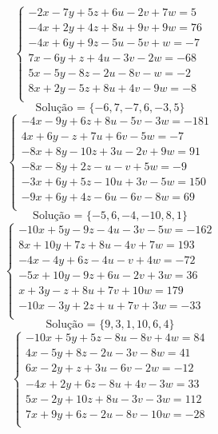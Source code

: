 \documentclass[12pt,oneside,a4paper]{article}
\begin{document}
\vspace{\baselineskip}
\begin{equation*}
\begin{cases}
-2x-7y+5z+6u-2v+7w=5 \\
-4x+2y+4z+8u+9v+9w=76 \\
-4x+6y+9z-5u-5v+w=-7 \\
7x-6y+z+4u-3v-2w=-68 \\
5x-5y-8z-2u-8v-w=-2 \\
8x+2y-5z+8u+4v-9w=-8 \\
\end{cases}
\end{equation*}
\begin{equation*}
\text{Solução = }\{-6,7,-7,6,-3,5\}
\end{equation*}
\vspace{\baselineskip}
\begin{equation*}
\begin{cases}
-4x-9y+6z+8u-5v-3w=-181 \\
4x+6y-z+7u+6v-5w=-7 \\
-8x+8y-10z+3u-2v+9w=91 \\
-8x-8y+2z-u-v+5w=-9 \\
-3x+6y+5z-10u+3v-5w=150 \\
-9x+6y+4z-6u-6v-8w=69 \\
\end{cases}
\end{equation*}
\begin{equation*}
\text{Solução = }\{-5,6,-4,-10,8,1\}
\end{equation*}
\vspace{\baselineskip}
\begin{equation*}
\begin{cases}
-10x+5y-9z-4u-3v-5w=-162 \\
8x+10y+7z+8u-4v+7w=193 \\
-4x-4y+6z-4u-v+4w=-72 \\
-5x+10y-9z+6u-2v+3w=36 \\
x+3y-z+8u+7v+10w=179 \\
-10x-3y+2z+u+7v+3w=-33 \\
\end{cases}
\end{equation*}
\begin{equation*}
\text{Solução = }\{9,3,1,10,6,4\}
\end{equation*}
\vspace{\baselineskip}
\begin{equation*}
\begin{cases}
-10x+5y+5z-8u-8v+4w=84 \\
4x-5y+8z-2u-3v-8w=41 \\
6x-2y+z+3u-6v-2w=-12 \\
-4x+2y+6z-8u+4v-3w=33 \\
5x-2y+10z+8u-3v-3w=112 \\
7x+9y+6z-2u-8v-10w=-28 \\
\end{cases}
\end{equation*}
\end{document}

